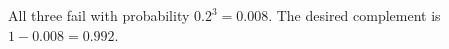 All three fail with probability $ 0.2^3=0.008 $. The desired complement is $ 1-0.008=\boxed{0.992}$.
